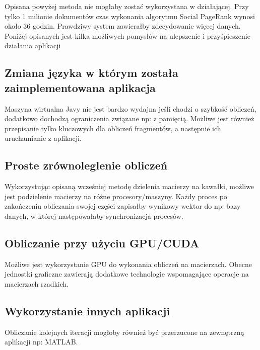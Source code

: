 \documentclass[11pt,a4paper]{report}
\begin{document}
Opisana powyżej metoda nie mogłaby zostać wykorzystana w działającej. Przy tylko 1 milionie dokumentów czas wykonania algorytmu Social PageRank wynosi około 36 godzin. Prawdziwy system zawierałby zdecydowanie więcej danych. Poniżej opisanych jest kilka możliwych pomysłów na ulepszenie i przyśpieszenie działania aplikacji

\subsection*{Zmiana języka w którym została zaimplementowana aplikacja}
Maszyna wirtualna Javy nie jest bardzo wydajna jeśli chodzi o szybkość obliczeń, dodatkowo dochodzą ograniczenia związane np: z pamięcią. Możliwe jest również przepisanie tylko kluczowych dla obliczeń fragmentów, a następnie ich uruchamianie z aplikacji. 

\subsection*{Proste zrównoleglenie obliczeń}
Wykorzystując opisaną wcześniej metodę dzielenia macierzy na kawałki, możliwe jest podzielenie macierzy na różne procesory/maszyny. Każdy proces po zakończeniu obliczania swojej części zapisałby wynikowy wektor do np: bazy danych, w której następowałaby synchronizacja procesów. 

\subsection*{Obliczanie przy użyciu GPU/CUDA} 

Możliwe jest wykorzystanie GPU do wykonania obliczeń na macierzach. Obecne jednostki graficzne zawierają dodatkowe technologie wspomagające operacje na macierzach rzadkich. 

\subsection*{Wykorzystanie innych aplikacji}

Obliczanie kolejnych iteracji mogłoby również być przerzucone na zewnętrzną aplikacji np: MATLAB.
\end{document}
